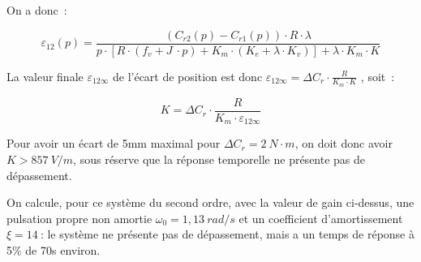 \documentclass[]{article}
\begin{document}
On a donc~:

\[\varepsilon_{12}\left( p \right) = \frac{\left( C_{r2}\left( p \right) - C_{r1}\left( p \right) \right) \cdot R \cdot \lambda}{p \cdot \left\lbrack R \cdot \left( f_{v} + J\  \cdot p \right) + K_{m} \cdot \left( K_{e} + \lambda \cdot K_{v} \right) \right\rbrack + \lambda \cdot K_{m} \cdot K}\]

La valeur finale \(\varepsilon_{12\infty}\) de l'écart de position est
donc
\(\varepsilon_{12\infty} = \Delta C_{r} \cdot \frac{R}{K_{m} \cdot K}\)
, soit~:

\[K = \Delta C_{r} \cdot \frac{R}{K_{m} \cdot \varepsilon_{12\infty}}\]

Pour avoir un écart de 5mm maximal pour \(\Delta C_{r} = 2\ N \cdot m\),
on doit donc avoir \(K > 857\ V \slash m\), sous réserve que la réponse
temporelle ne présente pas de dépassement.

On calcule, pour ce système du second ordre, avec la valeur de gain
ci-dessus, une pulsation propre non amortie
\(\omega_{0} = 1,13\ rad \slash s\) et un coefficient d'amortissement
\(\xi = 14\ \): le système ne présente pas de dépassement, mais a un
temps de réponse à 5\% de 70s environ.
\end{document}
